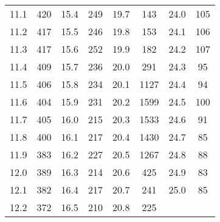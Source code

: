 \begin{table}[H]
\begin{tabular}{S[table-format=2.1] c | S[table-format=2.1] c | S[table-format=2.1] c | S[table-format=2.1] c}
\num{11.1} & \num{420}  &   \num{15.4} & \num{249}  &   \num{19.7} & \num{143}  &   \num{24.0} & \num{105}  \\
\num{11.2} & \num{417}  &   \num{15.5} & \num{246}  &   \num{19.8} & \num{153}  &   \num{24.1} & \num{106}  \\
\num{11.3} & \num{417}  &   \num{15.6} & \num{252}  &   \num{19.9} & \num{182}  &   \num{24.2} & \num{107}  \\
\num{11.4} & \num{409}  &   \num{15.7} & \num{236}  &   \num{20.0} & \num{291}  &   \num{24.3} & \num{95}   \\
\num{11.5} & \num{406}  &   \num{15.8} & \num{234}  &   \num{20.1} & \num{1127} &   \num{24.4} & \num{94}   \\
\num{11.6} & \num{404}  &   \num{15.9} & \num{231}  &   \num{20.2} & \num{1599} &   \num{24.5} & \num{100}  \\
\num{11.7} & \num{405}  &   \num{16.0} & \num{215}  &   \num{20.3} & \num{1533} &   \num{24.6} & \num{91}   \\
\num{11.8} & \num{400}  &   \num{16.1} & \num{217}  &   \num{20.4} & \num{1430} &   \num{24.7} & \num{85}   \\
\num{11.9} & \num{383}  &   \num{16.2} & \num{227}  &   \num{20.5} & \num{1267} &   \num{24.8} & \num{88}   \\
\num{12.0} & \num{389}  &   \num{16.3} & \num{214}  &   \num{20.6} & \num{425}  &   \num{24.9} & \num{83}   \\
\num{12.1} & \num{382}  &   \num{16.4} & \num{217}  &   \num{20.7} & \num{241}  &   \num{25.0} & \num{85}   \\
\num{12.2} & \num{372}  &   \num{16.5} & \num{210}  &   \num{20.8} & \num{225}  &              &            \\
  \bottomrule
  \end{tabular}
\end{table}

